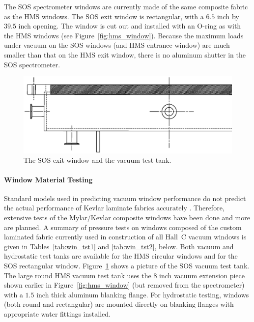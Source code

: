 The SOS spectrometer windows are currently made of the same composite fabric
as the HMS windows. The SOS exit window is rectangular, with a $6.5$ inch
by $39.5$ inch opening.
The window is cut out and installed with an O-ring as with the HMS
windows (see Figure~\ref{fig:hms_window}).
Because the maximum
loads under vacuum on the SOS windows (and HMS entrance window)
are much smaller than that on the HMS exit window,
there is
no aluminum shutter in the SOS spectrometer.

\begin{figure}
\includegraphics[width=6in]{figSOSwindow.eps}
\caption{The SOS exit window and the vacuum test tank. \label{fig:sos_window}}
\end{figure}

\paragraph{Window Material Testing}

Standard models used in predicting vacuum
window performance do not predict the actual performance of Kevlar laminate
fabrics accurately \cite{rbrook1,rllnl2}. Therefore, extensive tests of the
Mylar/Kevlar composite windows have been done and more are planned.
A summary of pressure
tests on windows composed of the custom laminated
fabric currently used in construction of all Hall~C vacuum windows is
given in Tables~\ref{tab:win_tst1} and \ref{tab:win_tst2}, below. Both vacuum and hydrostatic test 
tanks
are available for the HMS circular windows and for the SOS rectangular
window. Figure~\ref{fig:sos_window} shows a picture of the SOS vacuum
test tank.  The large round
HMS vacuum test tank uses the $8$ inch vacuum extension piece shown
earlier in Figure~\ref{fig:hms_window} (but removed from the spectrometer) with a $1.5$
inch thick aluminum blanking flange. For hydrostatic testing, windows (both
round and rectangular) are mounted directly on
blanking flanges with appropriate water fittings installed.

